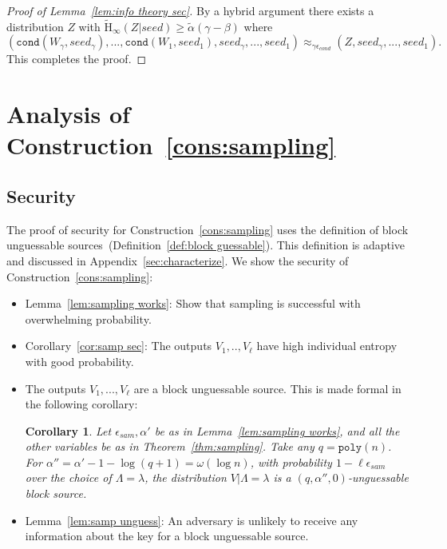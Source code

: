 \documentclass[11pt]{article}
\newcommand{\apref}[1]{\mbox{Appendix~\ref{#1}}}
\newcommand{\thref}[1]{\mbox{Theorem~\ref{#1}}}
\newcommand{\defref}[1]{\mbox{Definition~\ref{#1}}}
\newcommand{\corref}[1]{\mbox{Corollary~\ref{#1}}}
\newcommand{\lemref}[1]{\mbox{Lemma~\ref{#1}}}
\newcommand{\consref}[1]{\mbox{Construction~\ref{#1}}}
\newcommand{\class}[1]{{\ensuremath{\mathsf{#1}}}}
\newcommand{\sketch}{\ensuremath{\class{SS}}\xspace}
\newcommand{\rec}{\ensuremath{\class{Rec}}\xspace}
\newcommand{\poly}{\ensuremath{\mathtt{poly}}\xspace}
\newcommand{\Hav}{\tilde{\mathrm{H}}_\infty}
\newcommand{\cond}{\ensuremath{\mathtt{cond}}}
\newtheorem{corollary}[theorem]{Corollary}
\begin{document}
\begin{proof}[Proof of \lemref{lem:info theory sec}]
\noindent
By a hybrid argument there exists a distribution $Z$ with $\Hav(Z | seed) \ge \tilde{\alpha}(\gamma -\beta)$ where
\[
(\cond(W_\gamma, seed_\gamma), ..., \cond(W_1, seed_1), seed_\gamma,..., seed_1) \approx_{\gamma \epsilon_{cond}} (Z, seed_\gamma,...,  seed_1).\]
This completes the proof.
\end{proof}

\section{Analysis of \consref{cons:sampling}}
\label{sec:analysis sampling}
\subsection{Security}
The proof of security for \consref{cons:sampling} uses the definition of block unguessable sources~(\defref{def:block guessable}).  This definition is adaptive and discussed in \apref{sec:characterize}.
We show the security of \consref{cons:sampling}:
\begin{itemize}
\item \lemref{lem:sampling works}: Show that sampling is successful with overwhelming probability.
\item \corref{cor:samp sec}: The outputs $V_1,.., V_\ell$ have high individual entropy with good probability.
\item The outputs $V_1,..., V_\ell$ are a block unguessable source.  This is made formal in the following corollary:
\begin{corollary}
\label{cor:v are unguessable}
Let $\epsilon_{sam}, \alpha'$ be as in \lemref{lem:sampling works},  and all the other variables be as in \thref{thm:sampling}. Take any $q=\poly(n)$.  For $\alpha'' =\alpha'-1-\log (q+1) =  \omega(\log n)$, with  probability $1-\ell \epsilon_{sam}$ over the choice of $\Lambda=\lambda$, the distribution $V| \Lambda=\lambda$ is a $(q, \alpha'', 0)$-unguessable block source.
\end{corollary}
\item \lemref{lem:samp unguess}: An adversary is unlikely to receive any information about the key for a block unguessable source.
\end{itemize}
\end{document}
